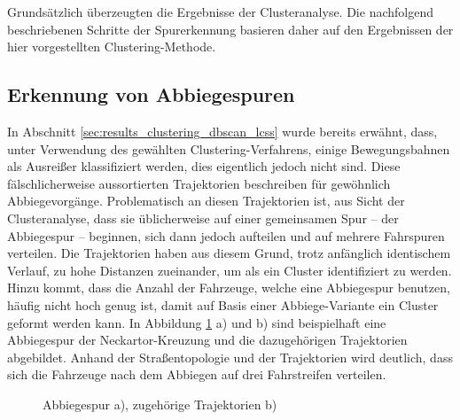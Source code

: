 Grundsätzlich überzeugten die Ergebnisse der Clusteranalyse. Die nachfolgend beschriebenen Schritte
der Spurerkennung basieren daher auf den Ergebnissen der hier vorgestellten Clustering-Methode.

\subsection{Erkennung von Abbiegespuren}
\label{sec:real_detect_turning_lane}

In Abschnitt \ref{sec:results_clustering_dbscan_lcss} wurde bereits erwähnt, dass, unter Verwendung des
gewählten Clustering-Verfahrens, einige Bewegungsbahnen als Ausreißer klassifiziert werden, dies eigentlich jedoch
nicht sind. Diese fälschlicherweise aussortierten Trajektorien beschreiben für gewöhnlich Abbiegevorgänge.
Problematisch an diesen Trajektorien ist, aus Sicht der Clusteranalyse, dass sie üblicherweise auf einer
gemeinsamen Spur -- der Abbiegespur -- beginnen, sich dann jedoch aufteilen und auf mehrere Fahrspuren verteilen.
Die Trajektorien haben aus diesem Grund, trotz anfänglich identischem Verlauf, zu hohe Distanzen zueinander, um
als ein Cluster identifiziert zu werden. Hinzu kommt, dass die Anzahl der Fahrzeuge, welche eine Abbiegespur
benutzen, häufig nicht hoch genug ist, damit auf Basis einer Abbiege-Variante ein Cluster geformt werden kann.
In Abbildung \ref{fig:real_turning_lane} a) und b) sind beispielhaft eine Abbiegespur der Neckartor-Kreuzung und
die dazugehörigen Trajektorien abgebildet. Anhand der Straßentopologie und der Trajektorien wird deutlich,
dass sich die Fahrzeuge nach dem Abbiegen auf drei Fahrstreifen verteilen.

\begin{figure}[H]
    \centering
    \qquad \qquad \qquad
    \caption[Abbiegespur Neckartor Kreuzung]{Abbiegespur a), zugehörige Trajektorien b)}
    \label{fig:real_turning_lane}
\end{figure}

